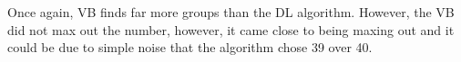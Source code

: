 
Once again, VB finds far more groups than the DL algorithm. However, the VB
did not max out the number, however, it came close to being maxing out and
it could be due to simple noise that the algorithm chose 39 over 40.

